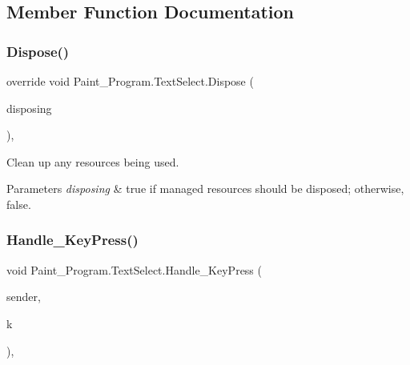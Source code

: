 \subsection{Member Function Documentation}
\mbox{\label{class_paint___program_1_1_text_select_a5ab7cbf1dde8ef28988f054a39a34905}} 
\subsubsection{\texorpdfstring{Dispose()}{Dispose()}}
{\footnotesize\ttfamily override void Paint\+\_\+\+Program.\+Text\+Select.\+Dispose (\begin{DoxyParamCaption}\item[{bool}]{disposing }\end{DoxyParamCaption})\hspace{0.3cm}{\ttfamily [inline]}, {\ttfamily [protected]}}



Clean up any resources being used. 


\begin{DoxyParams}{Parameters}
{\em disposing} & true if managed resources should be disposed; otherwise, false.\\
\hline
\end{DoxyParams}
\mbox{\label{class_paint___program_1_1_text_select_abf683438d39c8898627eeab6779ede95}} 
\subsubsection{\texorpdfstring{Handle\+\_\+\+Key\+Press()}{Handle\_KeyPress()}}
{\footnotesize\ttfamily void Paint\+\_\+\+Program.\+Text\+Select.\+Handle\+\_\+\+Key\+Press (\begin{DoxyParamCaption}\item[{object}]{sender,  }\item[{Key\+Event\+Args}]{k }\end{DoxyParamCaption})\hspace{0.3cm}{\ttfamily [inline]}, {\ttfamily [private]}}

